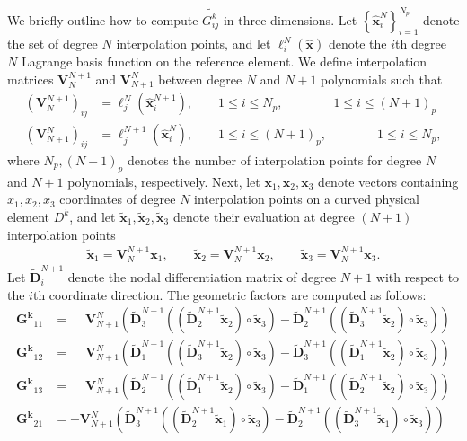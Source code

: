 \documentclass[10pt]{amsart}
\theoremstyle{definition}
\theoremstyle{lemma}
\theoremstyle{theorem}
\theoremstyle{assumption}
\renewcommand{\hat}{\widehat}
\renewcommand{\tilde}{\widetilde}
\newcommand{\LRp}[1]{\left( #1 \right)}
\newcommand{\LRc}[1]{\left\{ #1 \right\}}
\begin{document}
{We briefly outline how to compute $\tilde{G^k_{ij}}$ in three dimensions.  Let $\LRc{\hat{\bm{x}}^N_i}_{i=1}^{N_p}$ denote the set of degree $N$ interpolation points, and let $\ell^N_i(\hat{\bm{x}})$ denote the $i$th degree $N$ Lagrange basis function on the reference element.  We define interpolation matrices $\bm{V}_N^{N+1}$ and $\bm{V}^N_{N+1}$ between degree $N$ and $N+1$ polynomials such that 
\begin{align}
\LRp{\bm{V}_N^{N+1}}_{ij} &= \ell^N_j(\hat{\bm{x}}^{N+1}_i) , \qquad 1\leq i \leq N_p, \qquad \qquad 1\leq i \leq (N+1)_p\\
\LRp{\bm{V}^N_{N+1}}_{ij} &= \ell^{N+1}_j(\hat{\bm{x}}^{N}_i) , \qquad 1\leq i \leq (N+1)_p, \qquad \qquad 1\leq i \leq N_p, \nonumber
\end{align}
where $N_p, (N+1)_p$ denotes the number of interpolation points for degree $N$ and $N+1$ polynomials, respectively.  Next, let $\bm{x}_1,\bm{x}_2,\bm{x}_3$ denote vectors containing $x_1,x_2,x_3$ coordinates of degree $N$ interpolation points on a curved physical element $D^k$, and let $\tilde{\bm{x}}_1,\tilde{\bm{x}}_2,\tilde{\bm{x}}_3$ denote their evaluation at degree $(N+1)$ interpolation points
\begin{align}
\tilde{\bm{x}}_1 = \bm{V}_N^{N+1}\bm{x}_1, \qquad \tilde{\bm{x}}_2 = \bm{V}_N^{N+1}\bm{x}_2, \qquad \tilde{\bm{x}}_3 = \bm{V}_N^{N+1}\bm{x}_3.
\end{align}
Let $\tilde{\bm{D}}^{N+1}_i$ denote the nodal differentiation matrix of degree $N+1$ with respect to the $i$th coordinate direction.  The geometric factors are computed as follows:
\begin{align}
\bm{G^k}_{11} &= \phantom{-}\bm{V}_{N+1}^N\LRp{\tilde{\bm{D}}^{N+1}_3 \LRp{\LRp{ \tilde{\bm{D}}^{N+1}_2 \tilde{\bm{x}}_2} \circ\tilde{\bm{x}}_3} - \tilde{\bm{D}}^{N+1}_2 \LRp{ \LRp{\tilde{\bm{D}}^{N+1}_3\tilde{\bm{x}}_2} \circ\tilde{\bm{x}}_3}} \\
\bm{G^k}_{12} &= \phantom{-}\bm{V}_{N+1}^N\LRp{\tilde{\bm{D}}^{N+1}_1 \LRp{ \LRp{\tilde{\bm{D}}^{N+1}_3\tilde{\bm{x}}_2} \circ\tilde{\bm{x}}_3} - \tilde{\bm{D}}^{N+1}_3 \LRp{ \LRp{\tilde{\bm{D}}^{N+1}_1\tilde{\bm{x}}_2 }\circ\tilde{\bm{x}}_3}} \nonumber\\
\bm{G^k}_{13} &= \phantom{-}\bm{V}_{N+1}^N{\LRp{\tilde{\bm{D}}^{N+1}_2 \LRp{\LRp{ \tilde{\bm{D}}^{N+1}_1\tilde{\bm{x}}_2} \circ\tilde{\bm{x}}_3} - \tilde{\bm{D}}^{N+1}_1 \LRp{\LRp{ \tilde{\bm{D}}^{N+1}_2\tilde{\bm{x}}_2} \circ\tilde{\bm{x}}_3}}} \nonumber\\
%
\bm{G^k}_{21} &= -\bm{V}_{N+1}^N\LRp{\tilde{\bm{D}}^{N+1}_3 \LRp{\LRp{ \tilde{\bm{D}}^{N+1}_2 \tilde{\bm{x}}_1} \circ\tilde{\bm{x}}_3} - \tilde{\bm{D}}^{N+1}_2 \LRp{\LRp{ \tilde{\bm{D}}^{N+1}_3\tilde{\bm{x}}_1} \circ\tilde{\bm{x}}_3}} \nonumber \\

\end{align}}
\end{document}

